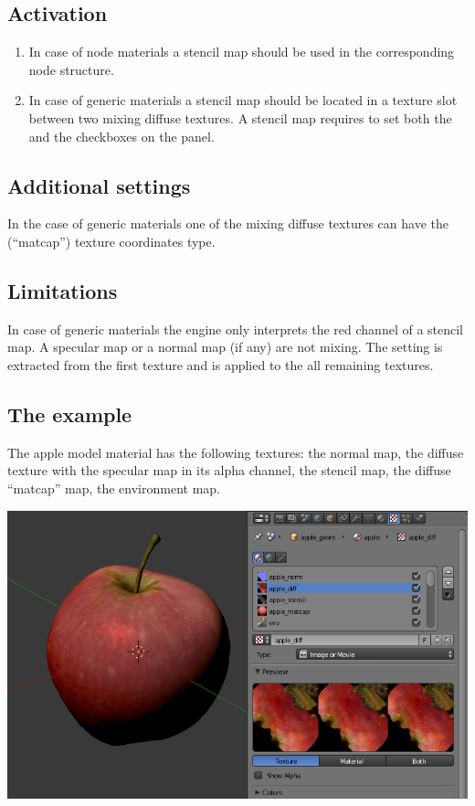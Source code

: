 \documentclass[a4paper,12pt,oneside]{sphinxmanual}
\begin{document}
\subsection{Activation}
\label{textures:id14}\begin{enumerate}
\item {} 
In case of node materials a stencil map should be used in the corresponding node structure.

\item {} 
In case of generic materials a stencil map should be located in a texture slot between two mixing diffuse textures. A stencil map requires to set both the  and the  checkboxes on the  panel.

\end{enumerate}


\subsection{Additional settings}
\label{textures:id15}
In the case of generic materials one of the mixing diffuse textures can have the  (``matcap'') texture coordinates type.


\subsection{Limitations}
\label{textures:id16}
In case of generic materials the engine only interprets the red channel of a stencil map. A specular map or a normal map (if any) are not mixing. The  setting is extracted from the first texture and is applied to the all remaining textures.


\subsection{The example}
\label{textures:id17}
The apple model material has the following textures: the normal map, the diffuse texture with the specular map in its alpha channel, the stencil map, the diffuse ``matcap'' map, the environment map.

{\hfill\includegraphics[width=1.000\linewidth]{stencil_apple.jpg}\hfill}
\end{document}
